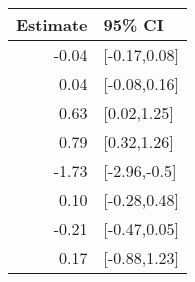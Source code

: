 \begin{tabular}{rl}
  \hline
Estimate & 95\% CI \\ 
  \hline
-0.04 & [-0.17,0.08] \\ 
  0.04 & [-0.08,0.16] \\ 
  0.63 & [0.02,1.25] \\ 
  0.79 & [0.32,1.26] \\ 
  -1.73 & [-2.96,-0.5] \\ 
  0.10 & [-0.28,0.48] \\ 
  -0.21 & [-0.47,0.05] \\ 
  0.17 & [-0.88,1.23] \\ 
   \hline
\end{tabular}


